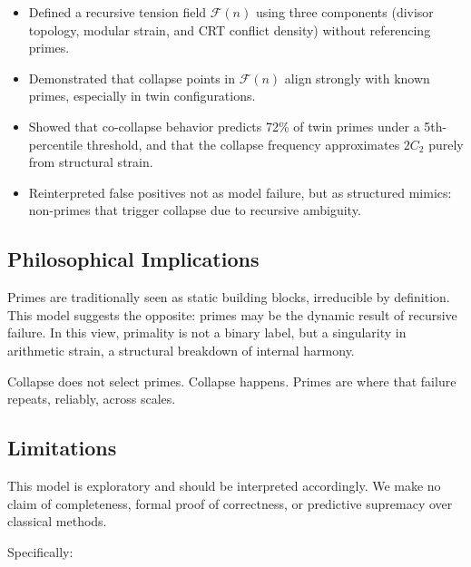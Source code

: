 \documentclass[11pt]{article}
\begin{document}
\begin{itemize}
  \item Defined a recursive tension field \(\mathcal{F}(n)\) using three components (divisor topology, modular strain, and CRT conflict density) without referencing primes.
  \item Demonstrated that collapse points in \(\mathcal{F}(n)\) align strongly with known primes, especially in twin configurations.
  \item Showed that co-collapse behavior predicts 72\% of twin primes under a 5th-percentile threshold, and that the collapse frequency approximates \(2C_2\) purely from structural strain.
  \item Reinterpreted false positives not as model failure, but as structured mimics: non-primes that trigger collapse due to recursive ambiguity.
\end{itemize}

\subsection{Philosophical Implications}

Primes are traditionally seen as static building blocks, irreducible by definition. This model suggests the opposite: primes may be the dynamic result of recursive failure. In this view, primality is not a binary label, but a singularity in arithmetic strain, a structural breakdown of internal harmony.

Collapse does not select primes. Collapse happens. Primes are where that failure repeats, reliably, across scales.

\subsection{Limitations}

This model is exploratory and should be interpreted accordingly. We make no claim of completeness, formal proof of correctness, or predictive supremacy over classical methods.

Specifically:
\end{document}
